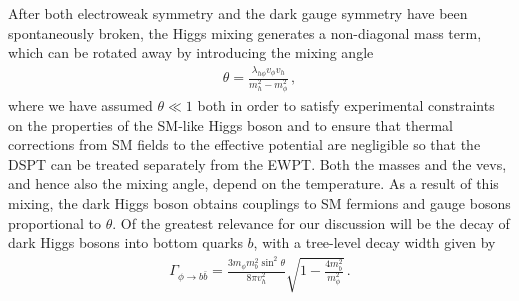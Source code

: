 After both electroweak symmetry and the dark gauge symmetry have been spontaneously broken, the Higgs mixing generates a non-diagonal mass term, which can be rotated away by introducing the mixing angle
\begin{align}\label{eq:mixing-angle}
	\theta = \frac{\lambda_{h\phi} v_\phi  v_h}{m_h^2 - m_\phi^2} \, ,
\end{align}
where we have assumed $\theta \ll 1$ both in order to satisfy experimental constraints on the properties of the \ac{SM}-like Higgs boson and to ensure that thermal corrections from \ac{SM} fields to the effective potential are negligible so that the \ac{DSPT} can be treated separately from the \ac{EWPT}. Both the masses and the \acp{vev}, and hence also the mixing angle, depend on the temperature. As a result of this mixing, the dark Higgs boson obtains couplings to \ac{SM} fermions and gauge bosons proportional to $\theta$. Of the greatest relevance for our discussion will be the decay of dark Higgs bosons into bottom quarks $b$, with a tree-level decay width given by
\begin{align}
	\Gamma_{\phi \to b\bar{b}} = \frac{3  m_\phi m_b^2 \sin^2 \theta}{8\pi v_h^2} \sqrt{1 - \frac{4 m_b^2}{m_\phi^2}} \, .
\end{align}

